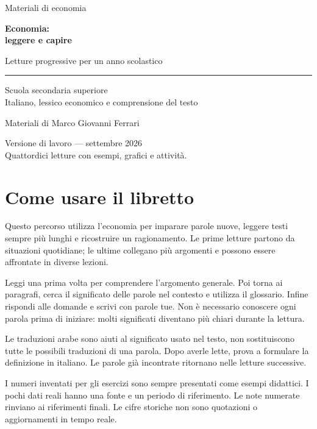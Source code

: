 \begin{titlepage}
\vspace*{22mm}
{\large Materiali di economia\par}
\vspace{12mm}
{\Huge\bfseries Economia:\\[5mm]leggere e capire\par}
\vspace{10mm}
{\Large Letture progressive per un anno scolastico\par}
\vspace{12mm}
\rule{\textwidth}{.5pt}
\vspace{5mm}
{\large Scuola secondaria superiore\\Italiano, lessico economico e comprensione del testo\par}
\vfill
{\large Materiali di Marco Giovanni Ferrari\par}
\vspace{4mm}
Versione di lavoro --- settembre 2026\\
Quattordici letture con esempi, grafici e attività.
\end{titlepage}
\section*{Come usare il libretto}
Questo percorso utilizza l'economia per imparare parole nuove, leggere testi sempre più lunghi e ricostruire un ragionamento. Le prime letture partono da situazioni quotidiane; le ultime collegano più argomenti e possono essere affrontate in diverse lezioni.

Leggi una prima volta per comprendere l'argomento generale. Poi torna ai paragrafi, cerca il significato delle parole nel contesto e utilizza il glossario. Infine rispondi alle domande e scrivi con parole tue. Non è necessario conoscere ogni parola prima di iniziare: molti significati diventano più chiari durante la lettura.

Le traduzioni arabe sono aiuti al significato usato nel testo, non sostituiscono tutte le possibili traduzioni di una parola. Dopo averle lette, prova a formulare la definizione in italiano. Le parole già incontrate ritornano nelle letture successive.

I numeri inventati per gli esercizi sono sempre presentati come esempi didattici. I pochi dati reali hanno una fonte e un periodo di riferimento. Le note numerate rinviano ai riferimenti finali. Le cifre storiche non sono quotazioni o aggiornamenti in tempo reale.

